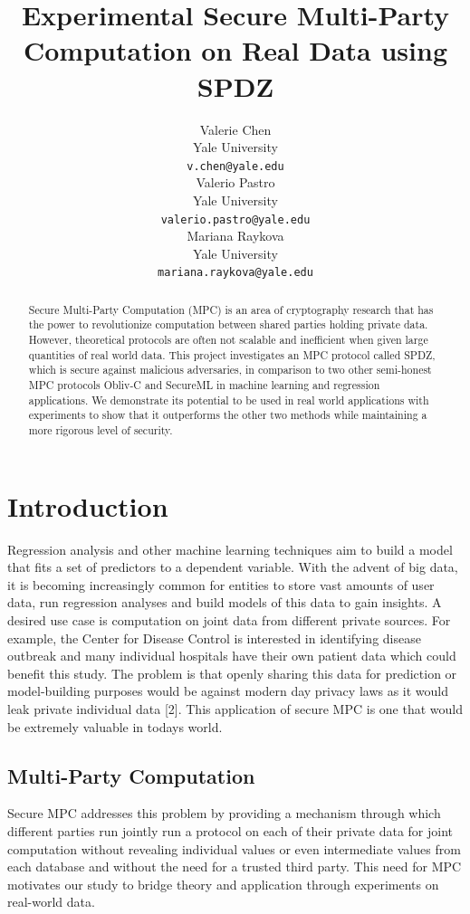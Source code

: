 \documentclass{article}
\title{Experimental Secure Multi-Party Computation on Real Data using SPDZ}
\author{
  Valerie Chen\\
  Yale University\\
  \texttt{v.chen@yale.edu} \\
  \And
  Valerio Pastro\\
  Yale University\\
  \texttt{valerio.pastro@yale.edu}\\
  \And
  Mariana Raykova \\
  Yale University \\
  \texttt{mariana.raykova@yale.edu} \\
}
\begin{document}
\maketitle

\begin{abstract}
Secure Multi-Party Computation (MPC) is an area of cryptography research that has the power to revolutionize computation between shared parties holding private data. However, theoretical protocols are often not scalable and inefficient when given large quantities of real world data. This project investigates an MPC protocol called SPDZ, which is secure against malicious adversaries, in comparison to two other semi-honest MPC protocols Obliv-C and SecureML in machine learning and regression applications. We demonstrate its potential to be used in real world applications with experiments to show that it outperforms the other two methods while maintaining a more rigorous level of security.
\end{abstract}

\section{Introduction}

Regression analysis and other machine learning techniques aim to build a model that fits a set of predictors to a dependent variable. With the advent of big data, it is becoming increasingly common for entities to store vast amounts of user data, run regression analyses and build models of this data to gain insights. A desired use case is computation on joint data from different private sources. For example, the Center for Disease Control is interested in identifying disease outbreak and many individual hospitals have their own patient data which could benefit this study. The problem is that openly sharing this data for prediction or model-building purposes would be against modern day privacy laws as it would leak private individual data [2]. This application of secure MPC is one that would be extremely valuable in today\textquotesingle s world.

\subsection{Multi-Party Computation}

Secure MPC addresses this problem by providing a mechanism through which different parties run jointly run a protocol on each of their private data for joint computation without revealing individual values or even intermediate values from each database and without the need for a trusted third party. This need for MPC motivates our study to bridge theory and application through experiments on real-world data. 
\end{document}
